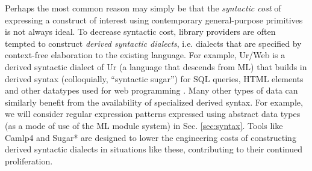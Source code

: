 Perhaps the most common reason may simply be that the \emph{syntactic cost} of expressing a construct of interest using contemporary general-purpose primitives is not always ideal. To decrease syntactic cost, library providers are often tempted to construct \emph{derived syntactic dialects}, i.e. dialects that are specified by context-free elaboration to the existing language. For example, Ur/Web is a  derived syntactic dialect of Ur (a language that descends from ML) that builds in derived syntax (colloquially, ``syntactic sugar'') for SQL queries, HTML elements and other datatypes used for web programming \cite{conf/popl/Chlipala15}. %
Many other types of data can similarly benefit from the availability of specialized derived syntax. For example, we will consider regular expression patterns expressed using abstract data types (as a mode of use of the ML module system) in Sec. \ref{sec:syntax}. %
Tools like Camlp4 \cite{ocaml-manual} and Sugar* \cite{erdweg2011sugarj,erdweg2013framework} are designed to lower the engineering costs of constructing derived syntactic dialects in situations like these, contributing to their continued proliferation. %


